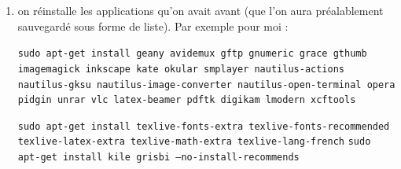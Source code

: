 \documentclass[a4paper,twoside]{article}
\begin{document}
\begin{enumerate}
\item on réinstalle les applications qu'on avait avant (que l'on aura préalablement sauvegardé sous forme de liste). Par exemple pour moi :

\texttt{sudo apt-get install geany avidemux gftp gnumeric grace gthumb imagemagick inkscape kate okular smplayer nautilus-actions nautilus-gksu nautilus-image-converter nautilus-open-terminal opera pidgin unrar vlc latex-beamer pdftk digikam lmodern xcftools}

\texttt{sudo apt-get install texlive-fonts-extra texlive-fonts-recommended texlive-latex-extra texlive-math-extra texlive-lang-french}
\texttt{sudo apt-get install kile grisbi --no-install-recommends}

%


\end{enumerate}
\end{document}
